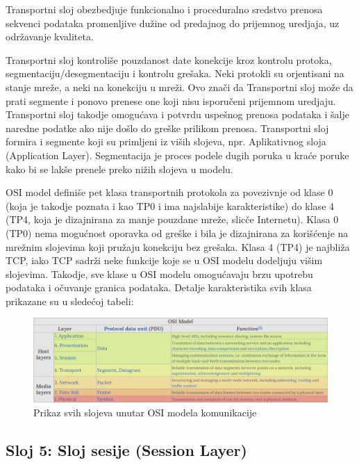 \documentclass[a4paper,12pt, master]{etf}
\begin{document}
	Transportni sloj obezbedjuje funkcionalno i proceduralno sredstvo prenosa
	sekvenci podataka promenljive du\v{z}ine od predajnog do prijemnog uredjaja,
	 uz odr\v{z}avanje kvaliteta.

	Transportni sloj kontroli\v{s}e pouzdanost date konekcije kroz kontrolu
	protoka, segmentaciju/desegmentaciju i kontrolu gre\v{s}aka. Neki protokli
	su orjentisani na stanje mre\v{z}e, a neki na konekciju u mre\v{z}i.
	Ovo zna\v{c}i da Transportni sloj mo\v{z}e da prati segmente i ponovo
    prenese one koji nisu isporu\v{c}eni prijemnom uredjaju. Transportni sloj
    takodje omogu\'{c}ava i potvrdu uspe\v{s}nog prenosa podataka i \v{s}alje
    naredne podatke ako nije do\v{s}lo do gre\v{s}ke prilikom prenosa.
    Transportni sloj formira i segmente koji su primljeni iz vi\v{s}ih slojeva,
    npr. Aplikativnog sloja (Application Layer). Segmentacija je proces podele
    dugih poruka u kra\'{c}e poruke kako bi se lak\v{s}e prenele preko ni\v{z}ih
    slojeva u modelu.

	OSI model defini\v{s}e pet klasa transportnih protokola za povezivnje od
	klase 0 (koja je takodje poznata i kao TP0 i ima najslabije karakteristike)
	do klase 4 (TP4, koja je dizajnirana za manje pouzdane mre\v{z}e,
	slic\v{c}e Internetu). Klasa 0 (TP0) nema mogu\'{c}nost	oporavka od
	gre\v{s}ke i bila je dizajnirana za kori\v{s}\'{c}enje na mre\v{z}nim
	slojevima koji pru\v{z}aju konekciju bez gre\v{s}aka. Klasa 4 (TP4) je
	najbli\v{z}a TCP, iako TCP sadr\v{z}i neke funkcije koje se u OSI modelu
	dodeljuju vi\v{s}im slojevima. Takodje, sve klase u OSI modelu
	omogu\'{c}avaju	brzu upotrebu podataka i o\v{c}uvanje granica podataka.
    Detalje karakteristika svih klasa prikazane su u slede\'{c}oj tabeli:

	\begin{figure}[htb]
			\centering
			\includegraphics[scale=.43]{../pic/osi_model.png}
			\caption{Prikaz svih slojeva unutar OSI modela komunikacije}
			\label{fig:osi_model}
	\end{figure}

	\subsection{Sloj 5: Sloj sesije (Session Layer)}
\end{document}
